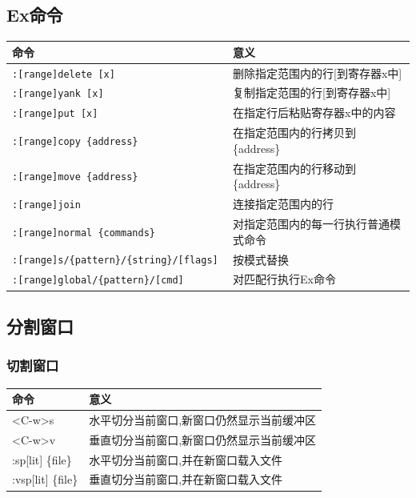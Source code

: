 \subsection{Ex命令}
\begin{longtable}{ll}\hline\hline

	\textbf{命令} & \textbf{意义}\\

    \endhead

	\texttt{:[range]delete [x]} & 删除指定范围内的行[到寄存器x中] \\

	\texttt{:[range]yank [x]} & 复制指定范围的行[到寄存器x中]\\

		\texttt{:[range]put [x]} & 在指定行后粘贴寄存器x中的内容\\

		\texttt{:[range]copy \{address\} }& 在指定范围内的行拷贝到 \{address\} \\

	\texttt{:[range]move \{address\}} & 在指定范围内的行移动到 \{address\} \\
	
	\texttt{:[range]join} & 连接指定范围内的行\\

		\texttt{:[range]normal \{commands\}} & 对指定范围内的每一行执行普通模式命令\\

	\texttt{:[range]s/\{pattern\}/\{string\}/[flags] }& 按模式替换\\

	\texttt{:[range]global/\{pattern\}/[cmd]} & 对匹配行执行Ex命令\\

    \hline
\end{longtable} 


\subsection{分割窗口}
\subsubsection{切割窗口}
\begin{longtable}{ll}\hline\hline

	\textbf{命令} & \textbf{意义}\\

    \endhead

	<C-w>s & 水平切分当前窗口,新窗口仍然显示当前缓冲区 \\

	<C-w>v & 垂直切分当前窗口,新窗口仍然显示当前缓冲区 \\

	:sp[lit] \{file\} & 水平切分当前窗口,并在新窗口载入文件 \\

	:vsp[lit] \{file\} & 垂直切分当前窗口,并在新窗口载入文件 \\

    \hline
\end{longtable} 

